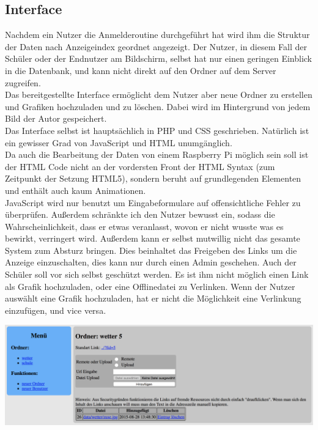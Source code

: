 \subsection{Interface} %
Nachdem ein Nutzer die Anmelderoutine durchgeführt hat wird ihm die Struktur der Daten nach Anzeigeindex geordnet angezeigt.
Der Nutzer, in diesem Fall der Schüler oder der Endnutzer am Bildschirm,
selbst hat nur einen geringen Einblick in die Datenbank, und kann nicht direkt auf den Ordner auf dem Server zugreifen.\\
Das bereitgestellte Interface ermöglicht dem Nutzer aber neue Ordner
zu erstellen und Grafiken hochzuladen und zu löschen.
Dabei wird im Hintergrund von jedem Bild der Autor gespeichert. \\
Das Interface selbst ist hauptsächlich in PHP und CSS geschrieben.
Natürlich ist ein gewisser Grad von JavaScript und HTML unumgänglich. \\
Da auch die Bearbeitung der Daten von einem Raspberry Pi möglich sein soll ist der HTML Code nicht an der vordersten Front der HTML Syntax (zum Zeitpunkt der Setzung HTML5),
sondern beruht auf grundlegenden Elementen und enthält auch kaum Animationen. \\
JavaScript wird nur benutzt um Eingabeformulare auf offensichtliche Fehler zu überprüfen.
Außerdem schränkte ich den Nutzer bewusst ein, sodass die Wahrscheinlichkeit,
dass er etwas veranlasst, wovon er nicht wusste was es bewirkt, verringert wird.
Außerdem kann er selbst mutwillig nicht das gesamte System zum Absturz bringen.
Dies beinhaltet das Freigeben des Links um die Anzeige einzuschalten,
dies kann nur durch einen Admin geschehen.
Auch der Schüler soll vor sich selbst geschützt werden.
Es ist ihm nicht möglich einen Link als Grafik hochzuladen,
oder eine Offlinedatei zu Verlinken.
Wenn der Nutzer auswählt eine Grafik hochzuladen,
hat er nicht die Möglichkeit eine Verlinkung einzufügen, und vice versa.
\begin{center}
\includegraphics[width=\linewidth]{imgs/wms/wms_interface.png}
\end{center}

